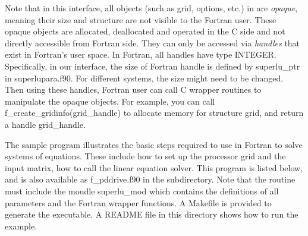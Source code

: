 Note that in this interface, all objects (such as \textsf{grid},
\textsf{options}, etc.) in {\superlud} are \emph{opaque}, meaning their size
and structure are not visible to the Fortran user.
These opaque objects are allocated, deallocated and operated in the C side
and not directly accessible from Fortran side. They can only be accessed
via \emph{handles} that exist in Fortran's user space. In Fortran, all handles
have type \textsf{INTEGER}. Specifically, in our interface, the size of Fortran
handle is defined by \textsf{superlu\_ptr} in \textsf{superlupara.f90}.
For different systems, the size might need to be changed. Then using these
handles, Fortran user can call C wrapper routines to manipulate the opaque
objects. For example, you can call \textsf{f\_create\_gridinfo(grid\_handle)}
to allocate memory for structure \textsf{grid},
and return a handle \textsf{grid\_handle}.


The sample program illustrates the basic steps required to use {\superlud}
in Fortran to solve systems of equations. These include how to set up the
processor grid and the input matrix, how to call the linear equation solver.
This program is listed below, and is also available as \textsf{f\_pddrive.f90}
in the subdirectory. Note that the routine must include the moudle 
\textsf{superlu\_mod} which contains the definitions 
of all parameters and the Fortran wrapper functions. A \textsf{Makefile} is
provided to generate the executable. A \textsf{README} file in this
directory shows how to run the example. 

